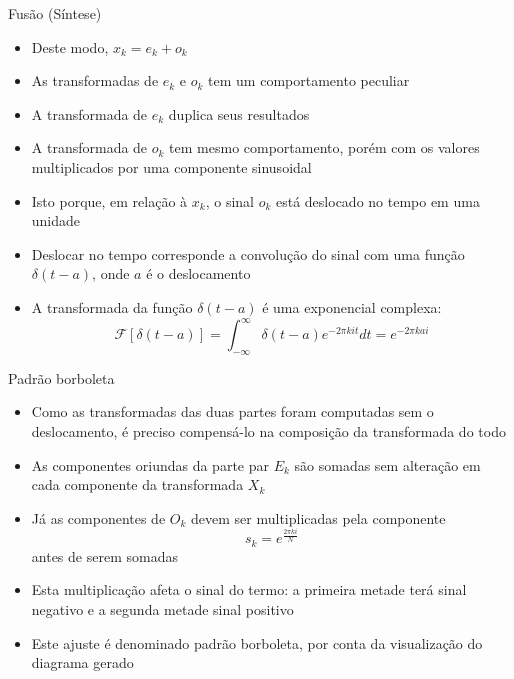 \begin{frame}[fragile]{Fusão (Síntese)}

    \begin{itemize}
        \item Deste modo, $x_k = e_k + o_k$

        \item As transformadas de $e_k$ e $o_k$ tem um comportamento peculiar

        \item A transformada de $e_k$ duplica seus resultados

        \item A transformada de $o_k$ tem mesmo comportamento, porém com os valores multiplicados
            por uma componente sinusoidal

        \item Isto porque, em relação à $x_k$, o sinal $o_k$ está deslocado no tempo em uma
            unidade

        \item Deslocar no tempo corresponde a convolução do sinal com uma função $\delta(t - a)$,
            onde $a$ é o deslocamento

        \item A transformada da função $\delta(t - a)$ é uma exponencial complexa:
        \[
            \mathcal{F}[\delta(t - a)] = \int_{-\infty}^{\infty} \delta(t - a)e^{-2\pi kit}dt =
                e^{-2\pi kai}
        \]
    
    \end{itemize}

\end{frame}



\begin{frame}[fragile]{Padrão borboleta}

    \begin{itemize}
        \item Como as transformadas das duas partes foram computadas sem o deslocamento, é preciso
            compensá-lo na composição da transformada do todo

        \item As componentes oriundas da parte par $E_k$ são somadas sem alteração em cada
            componente da transformada $X_k$

        \item Já as componentes de $O_k$ devem ser multiplicadas pela componente 
        \[
            s_k = e^{\frac{2\pi ki}{N}}
        \]
        antes de serem somadas

        \item Esta multiplicação afeta o sinal do termo: a primeira metade terá sinal negativo e
            a segunda metade sinal positivo

        \item Este ajuste é denominado padrão borboleta, por conta da visualização do diagrama
            gerado
    \end{itemize}

\end{frame}



